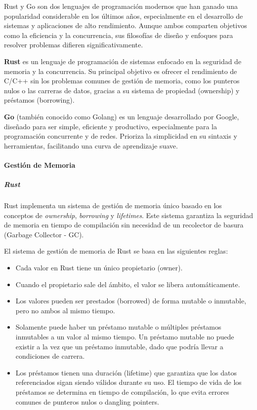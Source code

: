 Rust y Go son dos lenguajes de programación modernos que han ganado una popularidad considerable en los últimos años, especialmente en el desarrollo de sistemas y aplicaciones de alto rendimiento. Aunque ambos comparten objetivos como la eficiencia y la concurrencia, sus filosofías de diseño y enfoques para resolver problemas difieren significativamente.

\textbf{Rust} es un lenguaje de programación de sistemas enfocado en la seguridad de memoria y la concurrencia. Su principal objetivo es ofrecer el rendimiento de C/C++ sin los problemas comunes de gestión de memoria, como los punteros nulos o las carreras de datos, gracias a su sistema de propiedad (ownership) y préstamos (borrowing).

\textbf{Go} (también conocido como Golang) es un lenguaje desarrollado por Google, diseñado para ser simple, eficiente y productivo, especialmente para la programación concurrente y de redes. Prioriza la simplicidad en su sintaxis y herramientas, facilitando una curva de aprendizaje suave.

\paragraph{Gestión de Memoria}
\subparagraph{Rust}
Rust implementa un sistema de gestión de memoria único basado en los conceptos de \textit{ownership}, \textit{borrowing} y \textit{lifetimes}. Este sistema garantiza la seguridad de memoria en tiempo de compilación sin necesidad de un recolector de basura (Garbage Collector - GC).

El sistema de gestión de memoria de Rust se basa en las siguientes reglas:
\begin{itemize}
    \item Cada valor en Rust tiene un único propietario (owner).
    \item Cuando el propietario sale del ámbito, el valor se libera automáticamente.
    \item Los valores pueden ser prestados (borrowed) de forma mutable o inmutable, pero no ambos al mismo tiempo.
    \item Solamente puede haber un préstamo mutable o múltiples préstamos inmutables a un valor al mismo tiempo. Un préstamo mutable no puede existir a la vez que un préstamo inmutable, dado que podría llevar a condiciones de carrera.
    \item Los préstamos tienen una duración (lifetime) que garantiza que los datos referenciados sigan siendo válidos durante su uso. El tiempo de vida de los préstamos se determina en tiempo de compilación, lo que evita errores comunes de punteros nulos o dangling pointers.
\end{itemize}

